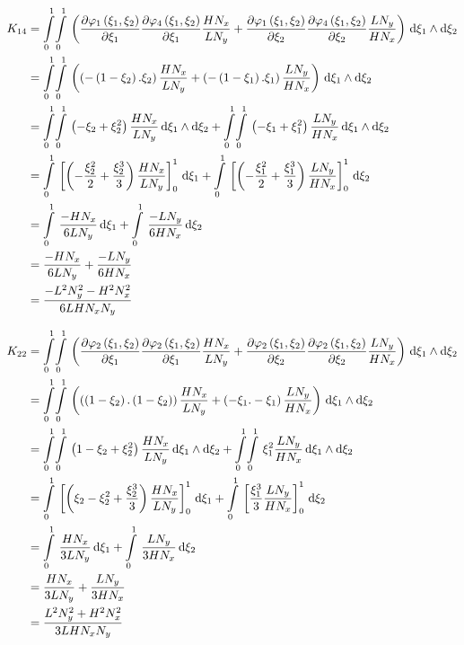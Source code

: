 \begin{equation}
  \begin{aligned}
    K_{14}&=\giint{0}{1}{0}{1}{\pbrac{\delby{\lbfn{1}{\xi_{1},\xi_{2}}}{\xi_{1}}\delby{\lbfn{4}{\xi_{1},\xi_{2}}}{\xi_{1}}
        \dfrac{H N_{x}}{L N_{y}}+\delby{\lbfn{1}{\xi_{1},\xi_{2}}}{\xi_{2}}\delby{\lbfn{4}{\xi_{1},\xi_{2}}}{\xi_{2}}
        \dfrac{L N_{y}}{H N_{x}}}}{\xi_{1}}{\xi_{2}}\\
    &=\giint{0}{1}{0}{1}{\pbrac{\pbrac{-\pbrac{1-\xi_{2}}.\xi_{2}}\dfrac{H N_{x}}{L N_{y}}+
    \pbrac{-\pbrac{1-\xi_{1}}.\xi_{1}}\dfrac{L N_{y}}{H N_{x}}}}{\xi_{1}}{\xi_{2}} \\
    &=\giint{0}{1}{0}{1}{\pbrac{-\xi_{2}+\xi_{2}^{2}}\dfrac{H N_{x}}{L N_{y}}}{\xi_{1}}{\xi_{2}}+
    \giint{0}{1}{0}{1}{\pbrac{-\xi_{1}+\xi_{1}^{2}}\dfrac{L N_{y}}{H N_{x}}}{\xi_{1}}{\xi_{2}} \\
    &=\gint{0}{1}{\sqbrac{\pbrac{-\dfrac{\xi_{2}^{2}}{2}+\dfrac{\xi_{2}^{3}}{3}}\dfrac{H N_{x}}{L N_{y}}}_{0}^{1}}{\xi_{1}}+
    \gint{0}{1}{\sqbrac{\pbrac{-\dfrac{\xi_{1}^{2}}{2}+\dfrac{\xi_{1}^{3}}{3}}\dfrac{L N_{y}}{H N_{x}}}_{0}^{1}}{\xi_{2}} \\
    &=\gint{0}{1}{\dfrac{-H N_{x}}{6 L N_{y}}}{\xi_{1}}+\gint{0}{1}{\dfrac{-L N_{y}}{6 H N_{x}}}{\xi_{2}} \\
    &=\dfrac{-H N_{x}}{6 L N_{y}}+\dfrac{-L N_{y}}{6 H N_{x}} \\
    &=\dfrac{-L^{2}N_{y}^{2}-H^{2}N_{x}^{2}}{6 L H N_{x} N_{y}}
  \end{aligned}
\end{equation}

\begin{equation}
  \begin{aligned}
    K_{22}&=\giint{0}{1}{0}{1}{\pbrac{\delby{\lbfn{2}{\xi_{1},\xi_{2}}}{\xi_{1}}\delby{\lbfn{2}{\xi_{1},\xi_{2}}}{\xi_{1}}
        \dfrac{H N_{x}}{L N_{y}}+\delby{\lbfn{2}{\xi_{1},\xi_{2}}}{\xi_{2}}\delby{\lbfn{2}{\xi_{1},\xi_{2}}}{\xi_{2}}
        \dfrac{L N_{y}}{H N_{x}}}}{\xi_{1}}{\xi_{2}}\\
    &=\giint{0}{1}{0}{1}{\pbrac{\pbrac{\pbrac{1-\xi_{2}}.\pbrac{1-\xi_{2}}}\dfrac{H N_{x}}{L N_{y}}+
    \pbrac{-\xi_{1}.-\xi_{1}}\dfrac{L N_{y}}{H N_{x}}}}{\xi_{1}}{\xi_{2}} \\
    &=\giint{0}{1}{0}{1}{\pbrac{1-\xi_{2}+\xi_{2}^{2}}\dfrac{H N_{x}}{L N_{y}}}{\xi_{1}}{\xi_{2}}+
    \giint{0}{1}{0}{1}{\xi_{1}^{2}\dfrac{L N_{y}}{H N_{x}}}{\xi_{1}}{\xi_{2}} \\
    &=\gint{0}{1}{\sqbrac{\pbrac{\xi_{2}-\xi_{2}^{2}+\dfrac{\xi_{2}^{3}}{3}}\dfrac{H N_{x}}{L N_{y}}}_{0}^{1}}{\xi_{1}}+
    \gint{0}{1}{\sqbrac{\dfrac{\xi_{1}^{3}}{3}\dfrac{L N_{y}}{H N_{x}}}_{0}^{1}}{\xi_{2}} \\
    &=\gint{0}{1}{\dfrac{H N_{x}}{3 L N_{y}}}{\xi_{1}}+\gint{0}{1}{\dfrac{L N_{y}}{3 H N_{x}}}{\xi_{2}} \\
    &=\dfrac{H N_{x}}{3 L N_{y}}+\dfrac{L N_{y}}{3 H N_{x}} \\
    &=\dfrac{L^{2}N_{y}^{2}+H^{2}N_{x}^{2}}{3 L H N_{x} N_{y}}
  \end{aligned}
\end{equation}

